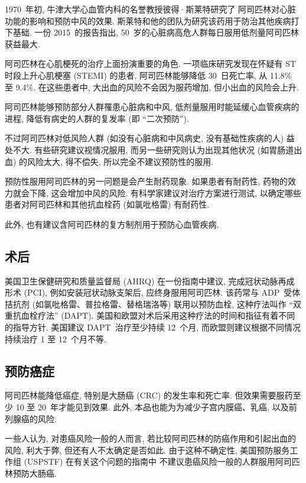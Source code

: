 1970~年初, 牛津大学心血管内科的名誉教授彼得·斯莱特研究了%
阿司匹林对心脏功能的影响和预防中风的效果.
斯莱特和他的团队为研究该药用于防治其他疾病打下基础.
一份 2015~的报告指出,
50~岁的心脏病高危人群每日服用低剂量阿司匹林获益最大.

阿司匹林在心肌梗死的治疗上面扮演重要的角色.
一项临床研究发现在怀疑有 ST 时段上升心肌梗塞 (STEMI) 的患者,
阿司匹林能够降低 30~日死亡率, 从 11.8\% 至 9.4\%.
在这些患者中, 大出血的风险不会因为服药增加, 但小出血的风险会上升.

阿司匹林能够预防部分人群罹患心脏病和中风,
低剂量服用时能延缓心血管疾病的进程,
降低有病史的人群的复发率 (即 ``二次预防'').

不过阿司匹林对低风险人群
(如没有心脏病和中风病史, 没有基础性疾病的人)
益处不大.
有些研究建议视情况服用,
而另一些研究则认为出现其他状况 (如胃肠道出血) 的风险太大,
得不偿失,
所以完全不建议预防性的服用.

预防性服用阿司匹林的另一问题是会产生耐药现象.
如果患者有耐药性, 药物的效力就会下降, 这会增加中风的风险.
有科学家建议对治疗方案进行测试,
以确定哪些患者对阿司匹林和其他抗血栓药 (如氯吡格雷) 有耐药性.

此外, 也有建议含阿司匹林的复方制剂用于预防心血管疾病.

\subsection{术后}

美国卫生保健研究和质量监督局 (AHRQ) 在一份指南中建议,
完成冠状动脉再成形术 (PCI),
例如安装冠状动脉支架后,
应终身服用阿司匹林.
该药常与 ADP~受体拮抗剂
(如氯吡格雷、普拉格雷、替格瑞洛等)
联用以预防血栓,
这种疗法叫作 ``双重抗血栓疗法'' (DAPT).
美国和欧盟对术后采用这种疗法的时间和指征有着不同的指导方针.
美国建议 DAPT~治疗至少持续 12~个月,
而欧盟则建议根据不同情况持续治疗 1 至 12~个月不等.

\subsection{预防癌症}

阿司匹林能降低癌症, 特别是大肠癌 (CRC) 的发生率和死亡率.
但效果需要服药至少 10 至 20~年才能见到效果.
此外, 本品也能为为减少子宫内膜癌、乳癌, 以及前列腺癌的风险.

一些人认为, 对患癌风险一般的人而言,
若比较阿司匹林的防癌作用和引起出血的风险, 利大于弊,
但还有人不太确定是否如此.
由于这种不确定性,
美国预防服务工作组 (USPSTF) 在有关这个问题的指南中%
不建议患癌风险一般的人群服用阿司匹林预防大肠癌.

